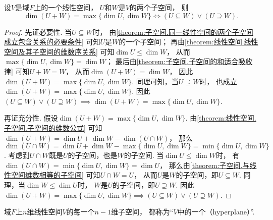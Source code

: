 \begin{corollary}\label{theorem:子空间.子空间的和的维数等于最大子空间维数的等价条件}
设\(V\)是域\(F\)上的一个线性空间，
\(U\)和\(W\)是\(V\)的两个子空间，
则\begin{equation*}
	\dim(U + W) = \max\{\dim U,\dim W\}
	\iff
	(U \subseteq W) \lor (U \supseteq W).
\end{equation*}
\begin{proof}
先证必要性.
当\(U \subseteq W\)时，
由\cref{theorem:子空间.同一线性空间的两个子空间成立包含关系的必要条件}
可知\(U\)是\(W\)的一个子空间；
再由\cref{theorem:线性空间.线性空间及其子空间的维数序关系}
可知\(\dim U \leq \dim W\)，
从而\(\max\{\dim U,\dim W\} = \dim W\)；
最后由\cref{theorem:子空间.子空间的和适合吸收律}
可知\(U + W = W\)，
从而\(\dim(U+W) = \dim W\)，
因此\(\dim(U+W) = \max\{\dim U,\dim W\}\).
同理可知，当\(U \supseteq W\)时，
也成立\(\dim(U+W) = \max\{\dim U,\dim W\}\).
因此\(
	(U \subseteq W) \lor (U \supseteq W)
	\implies
	\dim(U + W) = \max\{\dim U,\dim W\}
\).

再证充分性.
假设\(\dim(U + W) = \max\{\dim U,\dim W\}\).
由\cref{theorem:线性空间.子空间.子空间的维数公式}
可知\(
	\dim(U + W)
	=  \dim U + \dim W - \dim(U \cap W)
\)，
那么\(
	\dim(U \cap W)
	= \dim U + \dim W - \max\{\dim U,\dim W\}
	= \min\{\dim U,\dim W\}
\).
考虑到\(U \cap W\)既是\(U\)的子空间，也是\(W\)的子空间.
当\(\dim U \leq \dim W\)时，
有\(\dim(U \cap W) = \min\{\dim U,\dim W\} = \dim U\)，
那么由\cref{theorem:子空间.与线性空间维数相等的子空间}
可知\(U \cap W = U\)，
从而\(U\)是\(W\)的子空间，即\(U \subseteq W\).
同理，当\(\dim W \leq \dim U\)时，
\(W\)是\(U\)的子空间，即\(U \supseteq W\).
因此\(
	\dim(U + W) = \max\{\dim U,\dim W\}
	\implies
	(U \subseteq W) \lor (U \supseteq W)
\).
\end{proof}
\end{corollary}

\begin{definition}
域\(F\)上\(n\)维线性空间\(V\)的每一个\(n-1\)维子空间，
都称为“\(V\)中的一个（hyperplane）”.
\end{definition}

